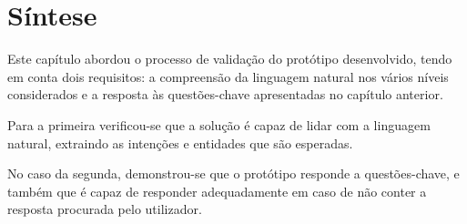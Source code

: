 
\section{Síntese}
\label{sec:chap06_chaptersummary}
Este capítulo abordou o processo de validação do protótipo desenvolvido, tendo em conta dois requisitos: a compreensão da linguagem natural nos vários níveis considerados e a resposta às questões-chave apresentadas no capítulo anterior.

Para a primeira verificou-se que a solução é capaz de lidar com a linguagem natural, extraindo as intenções e entidades que são esperadas. 

No caso da segunda, demonstrou-se que o protótipo responde a questões-chave, e também que é capaz de responder adequadamente em caso de não conter a resposta procurada pelo utilizador.